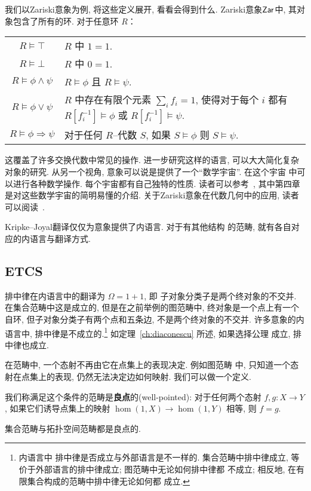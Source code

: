 我们以Zariski意象为例, 将这些定义展开, 看看会得到什么.
Zariski意象\(\textnormal{\textsf{Zar}}\)中, 其对象包含了所有的环.
对于任意环 \(R\)：
\begin{center}
\begin{tabular}{c @{\(\color{gray}{}\iff{}\)} p{}}\hline
\(R \vDash \top\) & \(R\) 中 \(1 = 1\).\\
\(R \vDash \bot\) & \(R\) 中 \(0 = 1\).\\
\(R \vDash \phi\wedge\psi\) & \(R \vDash \phi\)
  且 \(R \vDash \psi\).\\
\(R \vDash \phi\vee\psi\) & \(R\) 中存在有限个元素
  \(\sum_i f_i = 1\), 使得对于每个 \(i\) 都有
  \(R[f_i^{-1}] \vDash \phi\) 或
  \(R[f_i^{-1}]\vDash \psi\).\\
\(R \vDash \phi\Rightarrow\psi\) & 对于任何 \(R\)–代数
  \(S\), 如果 \(S \vDash \phi\) 则 \(S \vDash \psi\).\\\hline
\end{tabular}
\end{center}
这覆盖了许多交换代数中常见的操作.
进一步研究这样的语言, 可以大大简化复杂对象的研究.
从另一个视角, 意象可以说是提供了一个“数学宇宙”. 在这个宇宙
中可以进行各种数学操作. 每个宇宙都有自己独特的性质.
读者可以参考~\cite{oliveri:2022:structure},
其中第四章是对这些数学宇宙的简明易懂的介绍.
关于Zariski意象在代数几何中的应用, 读者可以阅读~\cite{blechschmidt:2021:internal}.

Kripke--Joyal翻译仅仅为意象提供了内语言. 对于有其他结构
的范畴, 就有各自对应的内语言与翻译方式.

\subsection{ETCS}
排中律在内语言中的翻译为 \(\Omega = 1 + 1\), 即
子对象分类子是两个终对象的不交并. 在集合范畴中这是成立的,
但是在之前举例的图范畴中, 终对象是一个点上有一个自环,
但子对象分类子有两个点和五条边, 不是两个终对象的不交并.
许多意象的内语言中, 排中律是不成立的.\footnote{内语言中
排中律是否成立与外部语言是不一样的. 集合范畴中排中律成立,
等价于外部语言的排中律成立; 图范畴中无论如何排中律都
不成立; 相反地, 在有限集合构成的范畴中排中律无论如何都
成立.} 如定理~\ref{ch:diaconescu} 所述, 如果选择公理
成立, 排中律也成立.


在范畴中, 一个态射不再由它在点集上的表现决定. 例如图范畴
中, 只知道一个态射在点集上的表现, 仍然无法决定边如何映射.
我们可以做一个定义.
\begin{definition}
我们称满足这个条件的范畴是\textbf{良点}的(well-pointed):
对于任何两个态射 \(f, g : X \to Y\),
如果它们诱导点集上的映射 \(\hom(1, X) \to \hom(1,Y)\)
相等, 则 \(f = g\).
\end{definition}
集合范畴与拓扑空间范畴都是良点的.

